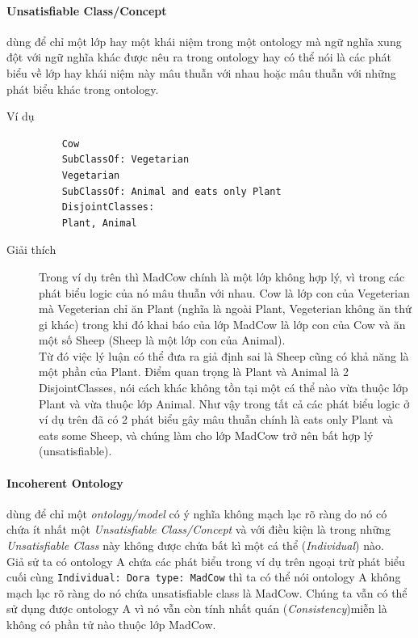 \paragraph{Unsatisfiable Class/Concept} dùng để chỉ một lớp hay một khái niệm trong một ontology mà ngữ nghĩa xung đột với ngữ nghĩa khác được nêu ra trong ontology hay có thể nói là các phát biểu về lớp hay khái niệm này mâu thuẫn với nhau hoặc mâu thuẫn với những phát biểu khác trong ontology.
\begin{description}
	\item[Ví dụ]
	\begin{verbatim}
	Cow
	SubClassOf: Vegetarian
	Vegetarian
	SubClassOf: Animal and eats only Plant
	DisjointClasses:
	Plant, Animal
	\end{verbatim}
	\item[Giải thích]
	Trong ví dụ trên thì MadCow chính là một lớp không hợp lý, vì trong các phát biểu logic của nó mâu thuẫn với nhau. Cow là lớp con của Vegeterian mà Vegeterian chỉ ăn Plant (nghĩa là ngoài Plant, Vegeterian không ăn thứ gi khác) trong khi đó khai báo của lớp MadCow là lớp con của Cow và ăn một số Sheep (Sheep là một lớp con của Animal).
	\\
	Từ đó việc lý luận có thể đưa ra giả định sai là Sheep cũng có khả năng là một phần của Plant. Điểm quan trọng là Plant và Animal là 2 DisjointClasses, nói cách khác không tồn tại một cá thể nào vừa thuộc lớp Plant và vừa thuộc lớp Animal. Như vậy trong tất cả các phát biểu logic ở ví dụ trên đã có 2 phát biểu gây mâu thuẫn chính là eats only Plant và eats some Sheep, và chúng làm cho lớp MadCow trở nên bất hợp lý (unsatisfiable).
\end{description}
\paragraph{Incoherent Ontology} dùng để chỉ một \textit{ontology/model} có ý nghĩa không mạch lạc rõ ràng do nó có chứa ít nhất một \textit{Unsatisfiable Class/Concept} và với điều kiện là trong những \textit{Unsatisfiable Class} này không được chứa bất kì một cá thể (\textit{Individual}) nào.
\\
\hspace{0.05\textwidth} Giả sử ta có ontology A chứa các phát biểu trong ví dụ trên ngoại trừ phát biểu cuối cùng \texttt{Individual: Dora type: MadCow} thì ta có thể nói ontology A không mạch lạc rõ ràng do nó chứa unsatisfiable class là MadCow. Chúng ta vẫn có thể sử dụng được ontology A vì nó vẫn còn tính nhất quán (\textit{Consistency})miễn là không có phần tử nào thuộc lớp MadCow.
